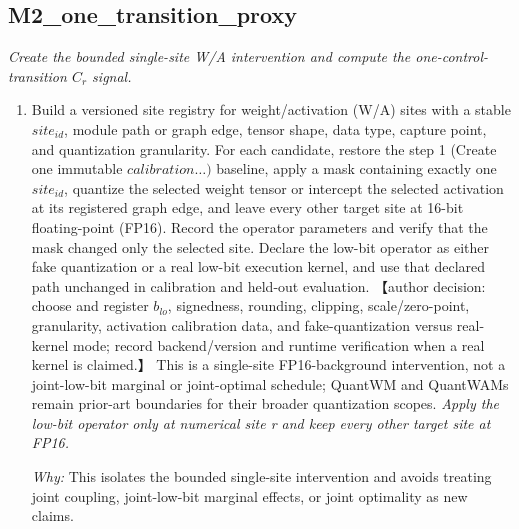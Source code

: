 \documentclass[10pt,a4paper]{article}
\begin{document}
\subsection*{M2\_one\_transition\_proxy}
\emph{Create the bounded single-site W/A intervention and compute the one-control-transition \(C_{r}\) signal.}
\begin{enumerate}[leftmargin=*,start=2]
  \item Build a versioned site registry for weight/activation (W/A) sites with a stable \(site_{id}\), module path or graph edge, tensor shape, data type, capture point, and quantization granularity. For each candidate, restore the step 1 (Create one immutable \(calibration\dots )\) baseline, apply a mask containing exactly one \(site_{id}\), quantize the selected weight tensor or intercept the selected activation at its registered graph edge, and leave every other target site at 16-bit floating-point (FP16). Record the operator parameters and verify that the mask changed only the selected site. Declare the low-bit operator as either fake quantization or a real low-bit execution kernel, and use that declared path unchanged in calibration and held-out evaluation. 【author decision: choose and register \(b_{lo}\), signedness, rounding, clipping, scale/zero-point, granularity, activation calibration data, and fake-quantization versus real-kernel mode;\allowbreak{} record backend/version and runtime verification when a real kernel is claimed.】 This is a single-site FP16-background intervention, not a joint-low-bit marginal or joint-optimal schedule;\allowbreak{} QuantWM and QuantWAMs remain prior-art boundaries for their broader quantization scopes.
\noindent\emph{Apply the low-bit operator only at numerical site r and keep every other target site at FP16.}
\par{}
\par\emph{Why:} This isolates the bounded single-site intervention and avoids treating joint coupling, joint-low-bit marginal effects, or joint optimality as new claims.

\end{enumerate}
\end{document}
